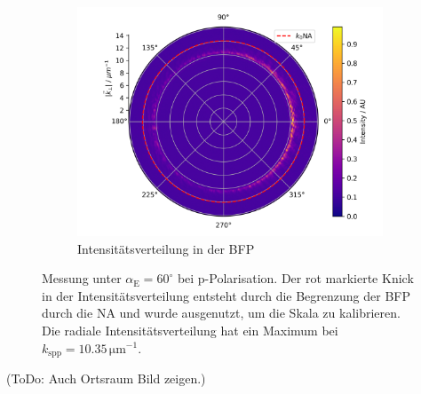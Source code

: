 \documentclass[titlepage,  ngerman]{article}
\begin{document}
\begin{figure}
\begin{subfigure}[b]{0.7\textwidth}
			\centering
			\includegraphics[width=\textwidth]{figures/example_polar.png}
			\caption{Intensitätsverteilung in der BFP}
			\label{fig:example_bfp}		
		\end{subfigure}
		\caption[Messwerte bei linearer Polarisation]{Messung unter $\alpha_{\mathrm{E}} = 60^\circ$ bei p-Polarisation.
			Der rot markierte Knick in der Intensitätsverteilung entsteht durch die Begrenzung der BFP durch die NA und wurde ausgenutzt, um die Skala zu kalibrieren. Die radiale Intensitätsverteilung hat ein Maximum bei $k_{\mathrm{spp}}= 10.35\,\mathrm{\mu m ^{-1}}$.}			
	\end{figure}
	(ToDo: Auch Ortsraum Bild zeigen.)
\end{document}
